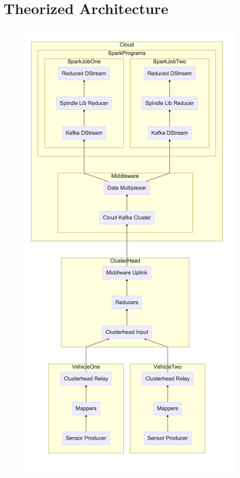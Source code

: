 \documentclass{thesis}
\begin{document}
\section{Theorized Architecture}
    \begin{figure}
        \centering
        \includegraphics[width=\linewidth]{binImages/theoretical-system.png}

\end{figure}
\end{document}
